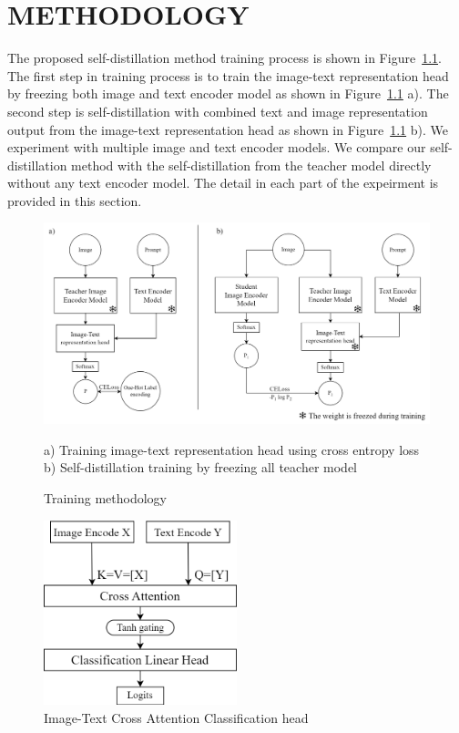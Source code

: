 \chapter{METHODOLOGY}
\label{ch:methodology}

The proposed self-distillation method training process is shown in Figure~\ref{fig:methodology}.
The first step in training process is to train the image-text representation head by freezing both image and text encoder model as shown in Figure~\ref{fig:methodology} a).
The second step is self-distillation with combined text and image representation output from the image-text representation head as shown in Figure~\ref{fig:methodology} b).
We experiment with multiple image and text encoder models.
We compare our self-distillation method with the self-distillation from the teacher model directly without any text encoder model.
The detail in each part of the expeirment is provided in this section.

\begin{figure}[h]
    \caption{Training methodology}
    \label{fig:methodology}
    \begin{center}
        \includegraphics[width=1\textwidth]{Images/Methodology.png}
    \end{center}
    \small a) Training image-text representation head using cross entropy loss b) Self-distillation training by freezing all teacher model
\end{figure}

\begin{figure}[h]
    \caption{Image-Text Cross Attention Classification head}
    \label{fig:cross_attention}
    \centering
    \includegraphics[width=0.5\textwidth]{Images/CrossAttention.png}
\end{figure}

